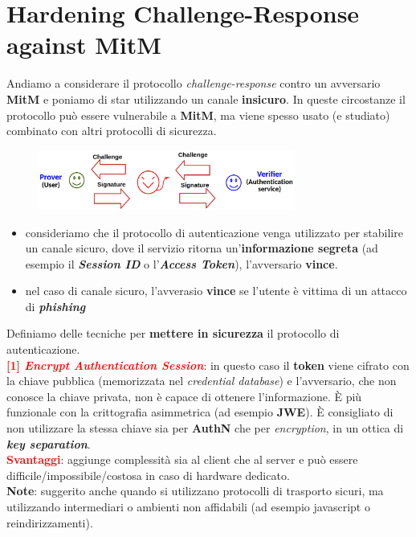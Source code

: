 \section{Hardening Challenge-Response against MitM}

\begin{flushleft}
    Andiamo a considerare il protocollo \textit{challenge-response} contro un avversario \textbf{MitM} e poniamo di star utilizzando un canale \textbf{insicuro}. In queste circostanze il protocollo può essere vulnerabile a \textbf{MitM}, ma viene spesso usato (e studiato) combinato con altri protocolli di sicurezza.

    \begin{figure}[h]
        \centering
        \includegraphics[width=0.75\textwidth]{img/cr_mitm.png}
    \end{figure}

    \begin{itemize}[nosep]
        \item consideriamo che il protocollo di autenticazione venga utilizzato per stabilire un canale sicuro, dove il servizio ritorna un'\textbf{informazione segreta} (ad esempio il \textbf{\textit{Session ID}} o l'\textbf{\textit{Access Token}}), l'avversario \textbf{vince}.
        \item nel caso di canale sicuro, l'avverasio \textbf{vince} se l'utente è vittima di un attacco di \textbf{\textit{phishing}}
    \end{itemize}

    Definiamo delle tecniche per \textbf{mettere in sicurezza} il protocollo di autenticazione. \\
    \textcolor{red}{\textbf{[1] \textit{Encrypt Authentication Session}}}: in questo caso il \textbf{token} viene cifrato con la chiave pubblica (memorizzata nel \textit{credential database}) e l'avversario, che non conosce la chiave privata, non è capace di ottenere l'informazione. È più funzionale con la crittografia asimmetrica (ad esempio \textbf{JWE}). È consigliato di non utilizzare la stessa chiave sia per \textbf{AuthN} che per \textit{encryption}, in un ottica di \textbf{\textit{key separation}}. \\
    \textcolor{red}{\textbf{Svantaggi}}: aggiunge complessità sia al client che al server e può essere difficile/impossibile/costosa in caso di hardware dedicato. \\
    \textbf{Note}: suggerito anche quando si utilizzano protocolli di trasporto sicuri, ma utilizzando intermediari o ambienti non affidabili (ad esempio javascript o reindirizzamenti).


\end{flushleft}
